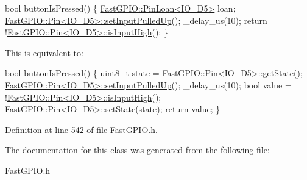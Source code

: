 \begin{DoxyCode}
\textcolor{keywordtype}{bool} buttonIsPressed()
\{
    \hyperlink{class_fast_g_p_i_o_1_1_pin_loan}{FastGPIO::PinLoan<IO\_D5>} loan;
    \hyperlink{class_fast_g_p_i_o_1_1_pin_a32eadc02b421b9b7fc92807bb3304f6e}{FastGPIO::Pin<IO\_D5>::setInputPulledUp}();
    \_delay\_us(10);
    \textcolor{keywordflow}{return} !\hyperlink{class_fast_g_p_i_o_1_1_pin_acbc38591335717f3feeed14f53b7b79c}{FastGPIO::Pin<IO\_D5>::isInputHigh}();
\}
\end{DoxyCode}


This is equivalent to\+:


\begin{DoxyCode}
\textcolor{keywordtype}{bool} buttonIsPressed()
\{
    uint8\_t \hyperlink{class_fast_g_p_i_o_1_1_pin_loan_a86acee97ba5ecd85d839dc31653e2727}{state} = \hyperlink{class_fast_g_p_i_o_1_1_pin_a79035949bafe62634210dd41486dba2c}{FastGPIO::Pin<IO\_D5>::getState}();
    \hyperlink{class_fast_g_p_i_o_1_1_pin_a32eadc02b421b9b7fc92807bb3304f6e}{FastGPIO::Pin<IO\_D5>::setInputPulledUp}();
    \_delay\_us(10);
    \textcolor{keywordtype}{bool} value = !\hyperlink{class_fast_g_p_i_o_1_1_pin_acbc38591335717f3feeed14f53b7b79c}{FastGPIO::Pin<IO\_D5>::isInputHigh}();
    \hyperlink{class_fast_g_p_i_o_1_1_pin_a6dae3821c6b8bcf9f3b7ac2e5114692c}{FastGPIO::Pin<IO\_D5>::setState}(state);
    \textcolor{keywordflow}{return} value;
\}
\end{DoxyCode}
 

Definition at line 542 of file Fast\+G\+P\+I\+O.\+h.



The documentation for this class was generated from the following file\+:\begin{DoxyCompactItemize}
\item 
\hyperlink{_fast_g_p_i_o_8h}{Fast\+G\+P\+I\+O.\+h}\end{DoxyCompactItemize}
